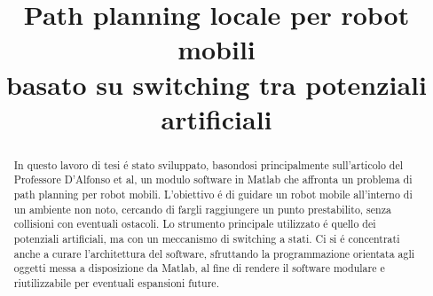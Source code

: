 \documentclass[14pt,a4paper]{extarticle}
\title{Path planning locale per robot mobili \\ basato su switching tra potenziali artificiali}
\author{}
\date{}
\begin{document}
\maketitle \newpage %
\tableofcontents \newpage %

\begin{abstract}
In questo lavoro di tesi é stato sviluppato, basondosi principalmente sull'articolo \cite{dalfonso} del Professore D'Alfonso et al, un modulo software in Matlab che affronta un problema di path planning per robot mobili. L'obiettivo é di guidare un robot mobile all'interno di un ambiente non noto, cercando di fargli raggiungere un punto prestabilito, senza collisioni con eventuali ostacoli. Lo strumento principale utilizzato é quello dei potenziali artificiali, ma con un meccanismo di switching a stati. Ci si é concentrati anche a curare l'architettura del software, sfruttando la programmazione orientata agli oggetti messa a disposizione da Matlab, al fine di rendere il software modulare e riutilizzabile per eventuali espansioni future.
\end{abstract}
\end{document}
